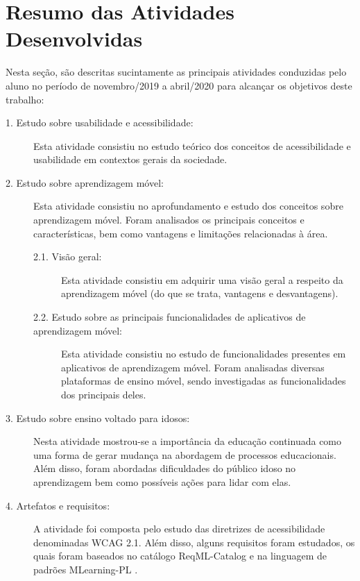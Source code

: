 \chapter{Resumo das Atividades Desenvolvidas} \label{sec:resumo_ativ}
Nesta seção, são descritas sucintamente as principais atividades conduzidas pelo aluno no período de novembro/2019 a abril/2020 para alcançar os objetivos deste trabalho:

\begin{description}
\item[1. Estudo sobre usabilidade e acessibilidade:]
Esta atividade consistiu no estudo teórico dos conceitos de acessibilidade e usabilidade em contextos gerais da sociedade.

\item[2. Estudo sobre aprendizagem móvel:] Esta atividade consistiu no aprofundamento e estudo dos conceitos sobre aprendizagem móvel. Foram analisados os principais conceitos e características, bem como vantagens e limitações relacionadas à área. 

\begin{description}
    \item[2.1. Visão geral:]
    Esta atividade consistiu em adquirir uma visão geral a respeito da aprendizagem móvel (do que se trata, vantagens e desvantagens).
    
    \item[2.2. Estudo sobre as principais funcionalidades de aplicativos de aprendizagem móvel:]
    Esta atividade consistiu no estudo de funcionalidades presentes em aplicativos de aprendizagem móvel. Foram analisadas diversas plataformas de ensino móvel, sendo investigadas as funcionalidades dos principais deles.
\end{description}

\item[3. Estudo sobre ensino voltado para idosos:] Nesta atividade mostrou-se a importância da educação continuada como uma forma de gerar mudança na abordagem de processos educacionais.
Além disso, foram abordadas dificuldades do público idoso no aprendizagem bem como possíveis ações para lidar com elas.

\item[4. Artefatos e requisitos:]
A atividade foi composta pelo estudo das diretrizes de acessibilidade denominadas WCAG 2.1. Além disso, alguns requisitos foram estudados, os quais foram baseados no catálogo ReqML-Catalog \citep{soad2017reqml} e na linguagem de padrões MLearning-PL \citep{Fioravanti2017_plop}.


\end{description}
